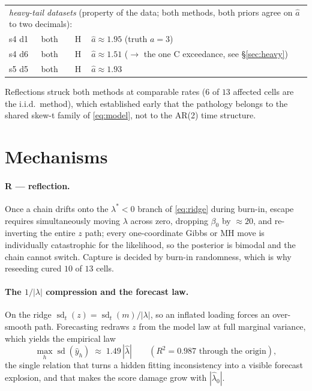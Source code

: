 \documentclass[11pt]{article}
\DeclareMathOperator{\sd}{sd}
\begin{document}
\begin{table}[ht]
\begin{tabular}{llcrclcrr}
\midrule
\multicolumn{9}{l}{\emph{heavy-tail datasets} (property of the data; both
methods, both priors agree on $\hat a$ to two decimals):} \\
s4 d1 & both & H & \multicolumn{6}{l}{$\hat a \approx 1.95$ \quad (truth $a = 3$)} \\
s4 d6 & both & H & \multicolumn{6}{l}{$\hat a \approx 1.51$ \quad ($\to$ the one C exceedance, see \S\ref{sec:heavy})} \\
s5 d5 & both & H & \multicolumn{6}{l}{$\hat a \approx 1.93$} \\
\bottomrule
\end{tabular}
\end{table}

Reflections struck both methods at comparable rates ($6$ of $13$
affected cells are the i.i.d.\ method), which established early that the
pathology belongs to the shared skew-t family of \eqref{eq:model}, not
to the AR(2) time structure.

\section{Mechanisms}

\paragraph{R --- reflection.} Once a chain drifts onto the
$\lambda^\ast < 0$ branch of \eqref{eq:ridge} during burn-in, escape
requires simultaneously moving $\lambda$ across zero, dropping $\beta_0$
by $\approx 20$, and re-inverting the entire $z$ path; every
one-coordinate Gibbs or MH move is individually catastrophic for the
likelihood, so the posterior is bimodal and the chain cannot switch.
Capture is decided by burn-in randomness, which is why reseeding cured
$10$ of $13$ cells.

\paragraph{The $1/|\lambda|$ compression and the forecast law.} On the
ridge $\sd_t(z) = \sd_t(m)/|\lambda|$, so an inflated loading forces an
over-smooth path. Forecasting redraws $z$ from the model law at full
marginal variance, which yields the empirical law
\begin{equation}
  \max_h \sd(\hat y_h) \;\approx\; 1.49\,|\hat\lambda|
  \qquad (R^2 = 0.987 \text{ through the origin}),
  \label{eq:law}
\end{equation}
the single relation that turns a hidden fitting inconsistency into a
visible forecast explosion, and that makes the score damage grow with
$|\hat\lambda_0|$.
\end{document}

